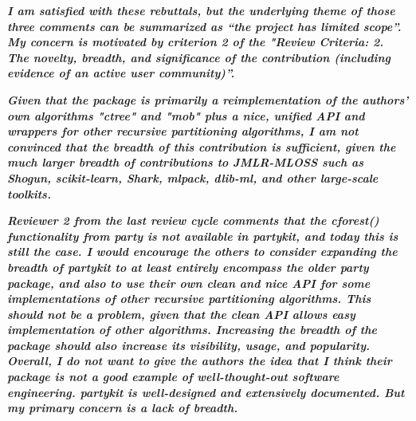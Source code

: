 \documentclass{article}
\begin{document}
\textbf{\textit{%
I am satisfied with these rebuttals, but the underlying theme of those three
comments can be summarized as ``the project has limited scope''.  My concern
is motivated by criterion 2 of the "Review Criteria: 2. The novelty, breadth, and significance of the contribution (including
evidence of an active user community)''.}}

\textbf{\textit{%
Given that the package is primarily a reimplementation of the authors' own
algorithms "ctree" and "mob" plus a nice, unified API and wrappers for other
recursive partitioning algorithms, I am not convinced that the breadth of
this contribution is sufficient, given the much larger breadth of
contributions to JMLR-MLOSS such as Shogun, scikit-learn, Shark, mlpack,
dlib-ml, and other large-scale toolkits.}}


\textbf{\textit{%
Reviewer 2 from the last review cycle comments that the cforest()
functionality from party is not available in partykit, and today this is
still the case.  I would encourage the others to consider expanding the
breadth of partykit to at least entirely encompass the older party package,
and also to use their own clean and nice API for some implementations of
other recursive partitioning algorithms.  This should not be a problem,
given that the clean API allows easy implementation of other algorithms.
Increasing the breadth of the package should also increase its visibility,
usage, and popularity.
Overall, I do not want to give the authors the idea that I think their
package is not a good example of well-thought-out software engineering. 
partykit is well-designed and extensively documented.  But my primary
concern is a lack of breadth.
}}
\end{document}
